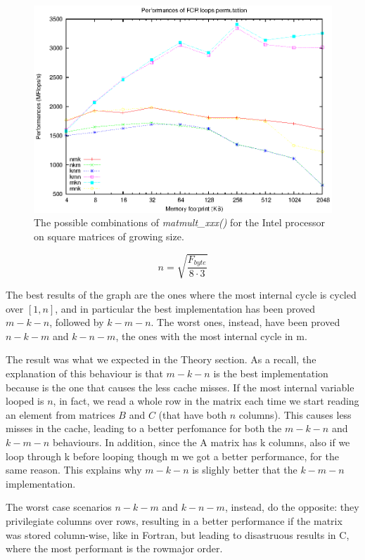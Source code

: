 \begin{figure}[here]
\centering
\includegraphics[width=\textwidth]{results/permutations.eps}
\caption{The possible combinations of \emph{matmult\_xxx()} for the Intel processor on square matrices of growing size.}
\label{fig:permutations}
\end{figure}


$$
n = \sqrt{\frac{F_{byte}}{8 \cdot 3} }
$$

The best results of the graph are the ones where the most internal cycle is cycled over $[1,n]$, and in particular the best implementation has been proved $m-k-n$, followed by $k-m-n$. The worst ones, instead, have been proved $n-k-m$ and $k-n-m$, the ones with the most internal cycle in m.

The result was what we expected in the Theory section. As a recall, the explanation of this behaviour is that $m-k-n$ is the best implementation because is the one that causes the less cache misses. If the most internal variable looped is $n$, in fact, we read a whole row in the matrix each time we start reading an element from matrices $B$ and $C$ (that have both $n$ columns). This causes less misses in the cache, leading to a better perfomance for both the $m-k-n$ and $k-m-n$ behaviours. In addition, since the A matrix has k columns, also if we loop through k before looping though m we got a better performance, for the same reason. This explains why $m-k-n$ is slighly better that  the $k-m-n$ implementation.

The worst case scenarios  $n-k-m$ and $k-n-m$, instead, do the opposite: they privilegiate columns over rows, resulting in a better performance if the matrix was stored column-wise, like in Fortran, but leading to disastruous results in C, where the most performant is the rowmajor order.

